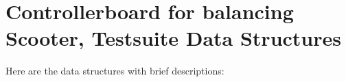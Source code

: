 \section{Controllerboard for balancing Scooter, Testsuite Data Structures}
Here are the data structures with brief descriptions:\begin{CompactList}
\item{}
\item{}
\end{CompactList}
